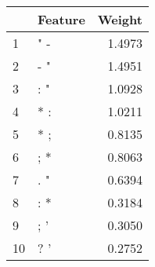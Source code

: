 \begin{tabular}{llr}
\toprule
{} & Feature &  Weight \\
\midrule
1  &     " - &  1.4973 \\
2  &     - " &  1.4951 \\
3  &     : " &  1.0928 \\
4  &     * : &  1.0211 \\
5  &     * ; &  0.8135 \\
6  &     ; * &  0.8063 \\
7  &     . " &  0.6394 \\
8  &     : * &  0.3184 \\
9  &     ; ' &  0.3050 \\
10 &     ? ' &  0.2752 \\
\bottomrule
\end{tabular}
